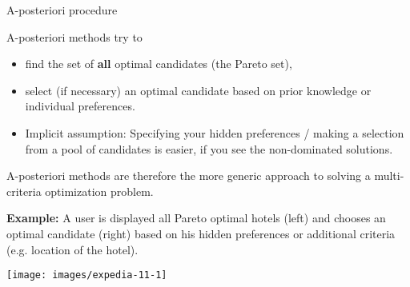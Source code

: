 \begin{frame}[allowframebreaks]{A-posteriori procedure}

A-posteriori methods try to

\begin{itemize}
\item find the set of \textbf{all} optimal candidates (the Pareto set),
\item select (if necessary) an optimal candidate based on prior knowledge or individual preferences.
\item Implicit assumption: Specifying your hidden preferences / making a selection from a pool of candidates is easier, if you see the non-dominated solutions.
\end{itemize}

A-posteriori methods are therefore the more generic approach to solving a multi-criteria optimization problem.


\framebreak

\textbf{Example:} A user is displayed all Pareto optimal hotels (left) and chooses an optimal candidate (right) based on his hidden preferences or additional criteria (e.g. location of the hotel).

\vspace*{0.1cm}


\centering \texttt{[image: images/expedia-11-1]}


\end{frame}


